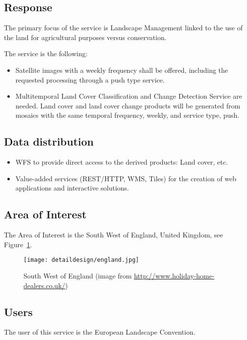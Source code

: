 \subsection{Response}
The primary focus of the service is Landscape Management linked to the use of the land for agricultural purposes versus conservation. 

The service is the following:
\begin{itemize}
\item Satellite images with a weekly frequency shall be offered, including the requested processing through a push type service.
\item Multitemporal Land Cover Classification and Change Detection Service are
  needed. Land cover and land cover change products will be generated from
  mosaics with the same temporal frequency, weekly, and service type, push.
\end{itemize}

\subsection{Data distribution}
\begin{itemize}
\item \ac{WFS} to provide direct access to the derived products: Land cover, etc.
\item Value-added services (REST/HTTP, WMS, Tiles) for the creation of web
  applications and interactive solutions. 
\end{itemize}

\subsection{Area of Interest} 
The Area of Interest is the South West of England, United Kingdom, see Figure~\ref{fig:england}.

 \begin{figure}[!h]
\begin{center}
\texttt{[image: detaildesign/england.jpg]}
\caption[South West of England]{South West of England (image from \url{http://www.holiday-home-dealers.co.uk/})}
\label{fig:england}
\end{center}
\end{figure}

\subsection{Users}
The user of this service is the European Landscape Convention.
